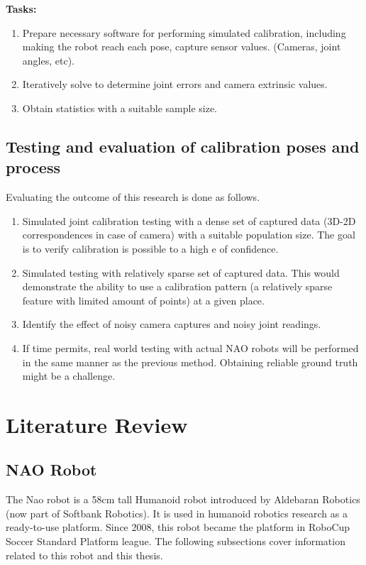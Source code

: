 \documentclass[english, printversion, nomenclature, notitle]{tuvisionthesis} %
\begin{document}
\textbf{Tasks:}
\begin{enumerate}
	\item Prepare necessary software for performing simulated calibration, including making the robot reach each pose, capture sensor values. (Cameras, joint angles, etc).
	\item Iteratively solve to determine joint errors and camera extrinsic values.
	\item Obtain statistics with a suitable sample size.
\end{enumerate}

\section{Testing and evaluation of calibration poses and process}
Evaluating the outcome of this research is done as follows.

\begin{enumerate}
	\item Simulated joint calibration testing with a dense set of captured data (3D-2D correspondences in case of camera) with a suitable population size.
	\subitem The goal is to verify calibration is possible to a high e of confidence.
	\item Simulated testing with relatively sparse set of captured data. This would demonstrate the ability to use a calibration pattern (a relatively sparse feature with limited amount of points) at a given place.
	\item Identify the effect of noisy camera captures and noisy joint readings.
	\item If time permits, real world testing with actual NAO robots will be performed in the same manner as the previous method. Obtaining reliable ground truth might be a challenge.
	
\end{enumerate}

\chapter{Literature Review}

\section{NAO Robot}

The Nao robot is a 58cm tall Humanoid robot introduced by Aldebaran Robotics (now part of Softbank Robotics). It is used in humanoid robotics research as a ready-to-use platform. Since 2008, this robot became the platform in RoboCup Soccer Standard Platform league. The following subsections cover information related to this robot and this thesis.
\end{document}
